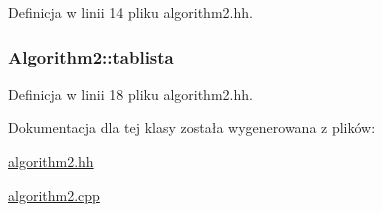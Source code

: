 Definicja w linii 14 pliku algorithm2.\-hh.

\hypertarget{class_algorithm2_af58d491bdb13e788c40754617f3b13df}{
\subsubsection[{tablista}]{ Algorithm2\-::tablista\hspace{0.3cm}{\ttfamily [private]}}}\label{class_algorithm2_af58d491bdb13e788c40754617f3b13df}


Definicja w linii 18 pliku algorithm2.\-hh.



Dokumentacja dla tej klasy została wygenerowana z plików\-:\begin{DoxyCompactItemize}
\item 
\hyperlink{algorithm2_8hh}{algorithm2.\-hh}\item 
\hyperlink{algorithm2_8cpp}{algorithm2.\-cpp}\end{DoxyCompactItemize}
